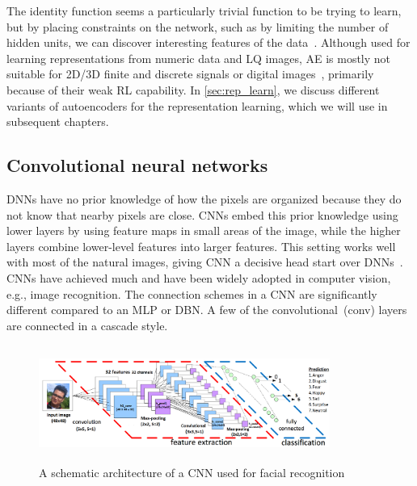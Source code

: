 \hspace*{3.5mm} The identity function seems a particularly trivial function to be trying to learn, but by placing constraints on the network, such as by limiting the number of hidden units, we can discover interesting features of the data~\cite{karimDLTF2018}. Although used for learning representations from numeric data and LQ images, AE is mostly not suitable for 2D/3D finite and discrete signals or digital images~\cite{min2018survey}, primarily because of their weak RL capability. In \cref{sec:rep_learn}, we discuss different variants of autoencoders for the representation learning, which we will use in subsequent chapters. 

\subsection{Convolutional neural networks}
DNNs have no prior knowledge of how the pixels are organized because they do not know that nearby pixels are close. CNNs embed this prior knowledge using lower layers by using feature maps in small areas of the image, while the higher layers combine lower-level features into larger features. This setting works well with most of the natural images, giving CNN a decisive head start over DNNs~\cite{karimIoT2019}. CNNs have achieved much and have been widely adopted in computer vision, e.g., image recognition. The connection schemes in a CNN are significantly different compared to an MLP or DBN. A few of the convolutional~(conv) layers are connected in a cascade style. 

\begin{figure}[h]
    \centering
    \includegraphics[width=0.85\textwidth,height=38mm]{images/cnn.png}
    \caption{A schematic architecture of a CNN used for facial recognition~\cite{karim2017predictive,zaccone2018deep}}
    \label{fig:cnn_theory1}
\end{figure}

